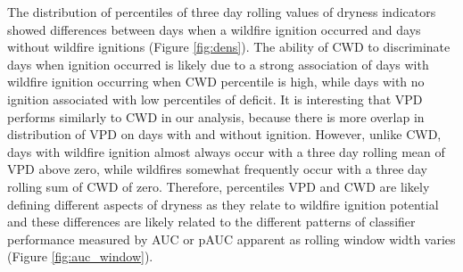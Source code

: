 \documentclass[11p]{article}
\begin{document}
The distribution of percentiles of three day rolling values of dryness indicators showed differences between days when a wildfire ignition occurred and days without wildfire ignitions (Figure \ref{fig:dens}). The ability of CWD to discriminate days when ignition occurred is likely due to a strong association of days with wildfire ignition occurring when CWD percentile is high, while days with no ignition associated with low percentiles of deficit. It is interesting that VPD performs similarly to CWD in our analysis, because there is more overlap in distribution of VPD on days with and without ignition. However, unlike CWD, days with wildfire ignition almost always occur with a three day rolling mean of VPD above zero, while wildfires somewhat frequently occur with a three day rolling sum of CWD of zero. Therefore, percentiles VPD and CWD are likely defining different aspects of dryness as they relate to wildfire ignition potential and these differences are likely related to the different patterns of classifier performance measured by AUC or pAUC apparent as rolling window width varies (Figure \ref{fig:auc_window}).
\end{document}

